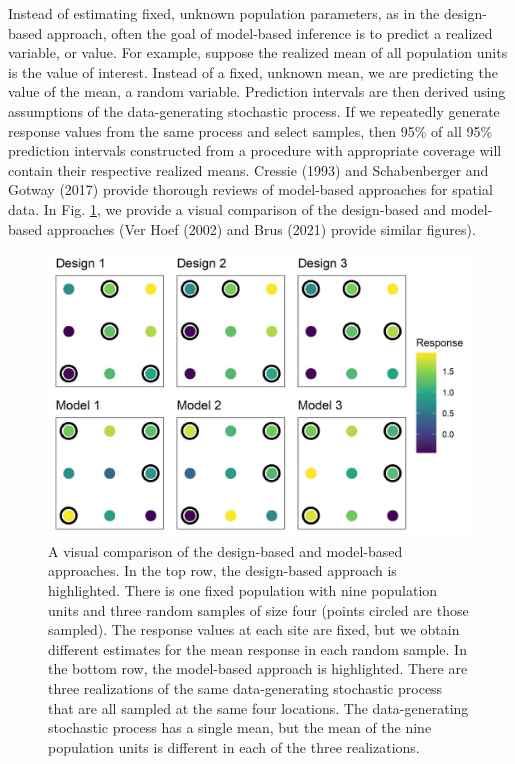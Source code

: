 \documentclass[]{elsarticle} %
\begin{document}
Instead of estimating fixed, unknown population parameters, as in the
design-based approach, often the goal of model-based inference is to
predict a realized variable, or value. For example, suppose the realized
mean of all population units is the value of interest. Instead of a
fixed, unknown mean, we are predicting the value of the mean, a random
variable. Prediction intervals are then derived using assumptions of the
data-generating stochastic process. If we repeatedly generate response
values from the same process and select samples, then 95\% of all 95\%
prediction intervals constructed from a procedure with appropriate
coverage will contain their respective realized means. Cressie (1993)
and Schabenberger and Gotway (2017) provide thorough reviews of
model-based approaches for spatial data. In Fig. \ref{fig:fig1}, we
provide a visual comparison of the design-based and model-based
approaches (Ver Hoef (2002) and Brus (2021) provide similar figures).

\begin{figure}
  \centering
  \includegraphics[width = 1\linewidth]{figures/dvm_comp.jpeg}
  \caption{A visual comparison of the design-based and model-based approaches. In the top row, the design-based approach is highlighted. There is one fixed population with nine population units and three random samples of size four (points circled are those sampled). The response values at each site are fixed, but we obtain different estimates for the mean response in each random sample. In the bottom row, the model-based approach is highlighted. There are three realizations of the same data-generating stochastic process that are all sampled at the same four locations. The data-generating stochastic process has a single mean, but the mean of the nine population units is different in each of the three realizations.}
  \label{fig:fig1}
\end{figure}
\end{document}

